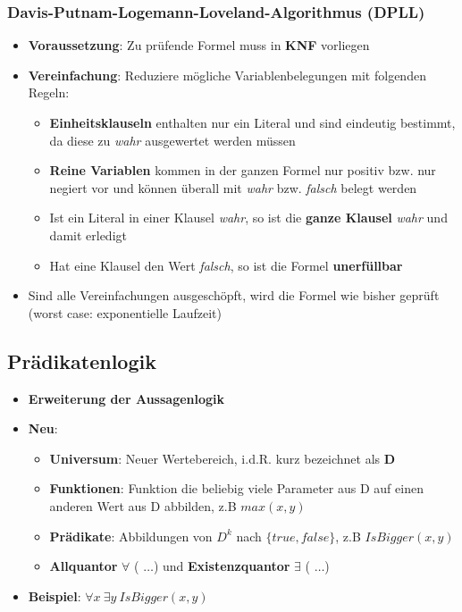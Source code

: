 \subsubsection{Davis-Putnam-Logemann-Loveland-Algorithmus (DPLL)}%
\label{wrep:ssub:davis_putnam_logemann_loveland_algorithmus}
\begin{itemize}
	\item \textbf{Voraussetzung}: Zu prüfende Formel muss in \textbf{KNF} vorliegen
	\item \textbf{Vereinfachung}: Reduziere mögliche Variablenbelegungen mit folgenden Regeln:
	\begin{itemize}
		\item \textbf{Einheitsklauseln} enthalten nur ein Literal und sind eindeutig bestimmt, da diese zu \textit{wahr} ausgewertet werden müssen
		\item \textbf{Reine Variablen} kommen in der ganzen Formel nur positiv bzw. nur negiert vor und können überall mit \textit{wahr} bzw. \textit{falsch} belegt werden
		\item Ist ein Literal in einer Klausel \textit{wahr}, so ist die \textbf{ganze Klausel} \textit{wahr} und damit erledigt
		\item Hat eine Klausel den Wert \textit{falsch}, so ist die Formel \textbf{unerfüllbar}
	\end{itemize}
	\item Sind alle Vereinfachungen ausgeschöpft, wird die Formel wie bisher geprüft (worst case: exponentielle Laufzeit)
\end{itemize}

\subsection{Prädikatenlogik}%
\label{wrep:sub:praedikatenlogik}

\begin{itemize}
	\item \textbf{Erweiterung der Aussagenlogik}
	\item \textbf{Neu}:
	\begin{itemize}
		\item \textbf{Universum}: Neuer Wertebereich, i.d.R. kurz bezeichnet als $\mathbf{D}$
		\item \textbf{Funktionen}: Funktion die beliebig viele Parameter aus D auf einen anderen Wert aus D abbilden, z.B $max(x, y)$
		\item \textbf{Prädikate}: Abbildungen von $D^k$ nach $\{true, false\}$, z.B $IsBigger(x, y)$
		\item \textbf{Allquantor} $\forall$ ( $\dots$) und \textbf{Existenzquantor} $\exists$ ( $\dots$)
	\end{itemize}
	\item \textbf{Beispiel}: $\forall x\ \exists y\ IsBigger(x, y)$
\end{itemize}

